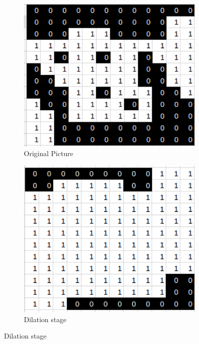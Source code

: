 \documentclass[11pt]{article}
\begin{document}
\begin{figure}[H]
	\centering
	\begin{subfigure}{.32\textwidth}
		\centering
		\includegraphics[scale=0.27]{pics/closing_o}
		\caption{Original Picture}
	\end{subfigure}
	\hfill
	\begin{subfigure}{.32\textwidth}
		\centering
		\includegraphics[scale=0.27]{pics/closing_d}
		\caption{Dilation stage}
		\label{dilationstage}
	\end{subfigure}

\end{figure}
\end{document}
